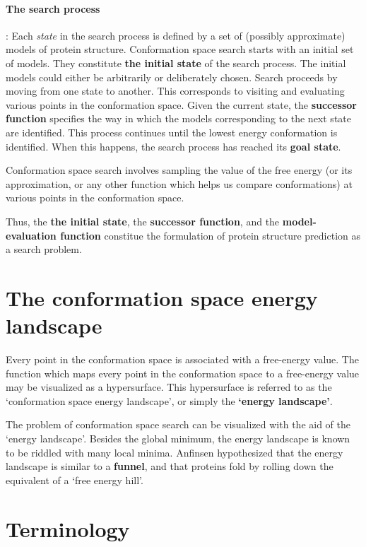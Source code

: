 \documentclass[10pt]{report}
\begin{document}
\paragraph{The search process}: Each \textit{state} in the search process is defined by a set of (possibly approximate) models of protein structure.  Conformation space search starts with an initial set of models. They constitute \textbf{the initial state} of the search process. The initial models could either be arbitrarily or deliberately chosen. Search proceeds by moving from one state to another. This corresponds to visiting and evaluating various points in the conformation space. Given the current state, the \textbf{successor function} specifies the way in which the models corresponding to the next state are identified. This process continues until the lowest energy conformation is identified. When this happens, the search process has reached its \textbf{goal state}.

Conformation space search involves sampling the value of the free energy (or its approximation, or any other function which helps us compare conformations) at various points in the conformation space.

Thus, the \textbf{the initial state}, the \textbf{successor function}, and the \textbf{model-evaluation function} constitue the formulation of protein structure prediction as a search problem.

\section{The conformation space energy landscape}

Every point in the conformation space is associated with a free-energy value. The function which maps every point in the conformation space to a free-energy value may be visualized as a hypersurface. This hypersurface is referred to as the `conformation space energy landscape', or simply the \textbf{`energy landscape'}.

The problem of conformation space search can be visualized with the aid of the `energy landscape'. Besides the global minimum, the energy landscape is known to be riddled with many local minima. Anfinsen hypothesized that the energy landscape is similar to a \textbf{funnel}, and that proteins fold by rolling down the equivalent of a `free energy hill'.

\section{Terminology}
\end{document}
